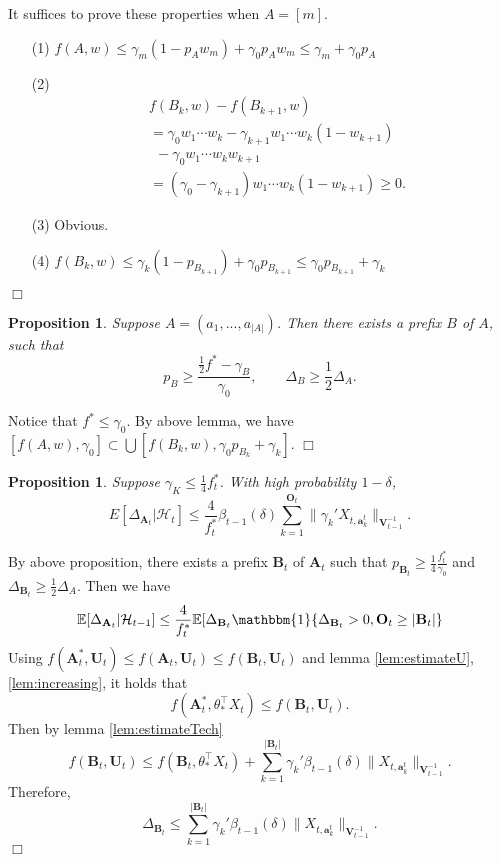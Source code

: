 \documentclass{article}
\newcommand{\bOne}{\mathbbm{1}}
\newcommand{\bA}{\mathbf{A}}
\newcommand{\ba}{\mathbf{a}}
\newcommand{\bB}{\mathbf{B}}
\newcommand{\bO}{\mathbf{O}}
\newcommand{\bU}{\mathbf{U}}
\newcommand{\bV}{\mathbf{V}}
\newcommand{\cH}{\mathcal{H}}
\newcommand{\EE}{\mathbb{E}}
\newcommand{\abs}[1]{\left| #1 \right|}
\newcommand{\norm}[1]{\| #1 \|}
\newtheorem{proposition}[theorem]{Proposition}%
\newenvironment{proof}{\noindent {\textbf{Proof. }}}{$\Box$ \medskip}
\begin{document}
\begin{proof}
It suffices to prove these properties when $A = [m]$.
\begin{itemize}
\item[(1)]
$f(A, w) \leq \gamma_m(1 - p_A w_m) + \gamma_0 p_A w_m \leq \gamma_m + \gamma_0 p_A$

\item[(2)]
\begin{align*}
&f(B_k, w) - f(B_{k+1}, w)\\
&=\gamma_0 w_1 \cdots w_k - \gamma_{k+1} w_1 \cdots w_k (1 - w_{k+1})\\
&~~ - \gamma_0 w_1 \cdots w_{k} w_{k+1}\\
&=(\gamma_0 - \gamma_{k+1}) w_1 \cdots w_k (1 - w_{k+1}) \geq 0.
\end{align*}

\item[(3)]
Obvious.

\item[(4)]
$f(B_k, w) \leq \gamma_k (1 - p_{B_{k+1}}) + \gamma_0 p_{B_{k+1}}\leq \gamma_0 p_{B_{k+1}} + \gamma_{k}$
\end{itemize}
\end{proof}

\begin{proposition}
Suppose $A = (a_1, ..., a_{\abs{A}})$. Then there exists a prefix $B$ of $A$, such that 
$$
p_{B} \geq \frac{\frac{1}{2}f^* - \gamma_{B}}{\gamma_0}, \qquad \Delta_{B} \geq \frac{1}{2}\Delta_A.
$$ 
\end{proposition}
\begin{proof}
	Notice that $f^* \leq \gamma_0$. By above lemma, we have $[f(A,w), \gamma_0] \subset \bigcup [f(B_k,w), \gamma_0 p_{B_k} + \gamma_k]$.
\end{proof}


\begin{proposition}
Suppose $\gamma_K \leq \frac{1}{4} f_t^*$. With high probability $1-\delta$, 
$$
E[\Delta_{\bA_t}|\cH_t] \leq \frac{4}{f_t^*} \beta_{t-1}(\delta)\sum_{k=1}^{\bO_t}\norm{\gamma_k' X_{t,\ba_k^t}}_{\bV_{t-1}^{-1}}.
$$
\end{proposition}
\begin{proof}
By above proposition, there exists a prefix $\bB_t$ of $\bA_t$ such that $p_{\bB_t} \geq \frac{1}{4}\frac{f_t^*}{\gamma_0}$ and $\Delta_{\bB_t} \geq \frac{1}{2}\Delta_A$. Then we have
$$
\EE[\Delta_{\bA_t} | \cH_{t-1}] \leq \frac{4}{f_t^*} \EE[\Delta_{\bB_t} \bOne\{\Delta_{\bB_t} > 0, \bO_t \geq \abs{\bB_t}\}
$$
Using $f(\bA_t^*,\bU_t) \leq f(\bA_t,\bU_t) \leq f(\bB_t,\bU_t)$ and lemma \ref{lem:estimateU}, \ref{lem:increasing}, it holds that
$$
f(\bA_t^*, \theta_*^{\top}X_t) \leq f(\bB_t,\bU_t).
$$
Then by lemma \ref{lem:estimateTech}
$$
f(\bB_t,\bU_t) \leq f(\bB_t, \theta_*^{\top}X_t) + \sum_{k=1}^{\abs{\bB_t}}\gamma_k'\beta_{t-1}(\delta)\norm{X_{t,\ba_k^t}}_{\bV_{t-1}^{-1}}.
$$
Therefore,
$$
\Delta_{\bB_t} \leq \sum_{k=1}^{\abs{\bB_t}}\gamma_k'\beta_{t-1}(\delta)\norm{X_{t,\ba_k^t}}_{\bV_{t-1}^{-1}}.
$$
\end{proof}
\end{document}

